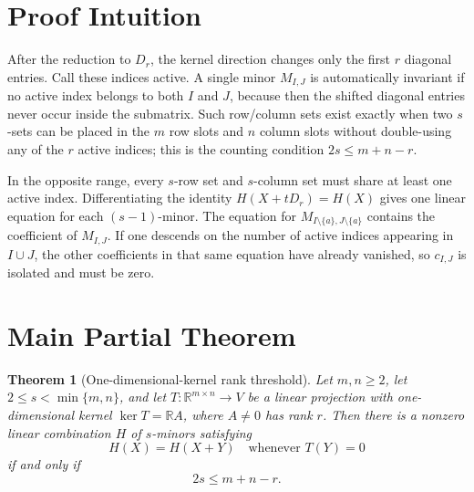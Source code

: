 \documentclass[11pt]{article}
\newtheorem{theorem}{Theorem}
\newcommand{\R}{\mathbb R}
\begin{document}
\section*{Proof Intuition}

After the reduction to $D_r$, the kernel direction changes only the first $r$
diagonal entries. Call these indices active. A single minor $M_{I,J}$ is
automatically invariant if no active index belongs to both $I$ and $J$, because
then the shifted diagonal entries never occur inside the submatrix. Such
row/column sets exist exactly when two $s$-sets can be placed in the $m$ row
slots and $n$ column slots without double-using any of the $r$ active indices;
this is the counting condition $2s\le m+n-r$.

In the opposite range, every $s$-row set and $s$-column set must share at least
one active index. Differentiating the identity $H(X+tD_r)=H(X)$ gives one
linear equation for each $(s-1)$-minor. The equation for
$M_{I\setminus\{a\},J\setminus\{a\}}$ contains the coefficient of
$M_{I,J}$. If one descends on the number of active indices appearing in
$I\cup J$, the other coefficients in that same equation have already vanished,
so $c_{I,J}$ is isolated and must be zero.

\section*{Main Partial Theorem}

\begin{theorem}[One-dimensional-kernel rank threshold]
\label{thm:main}
Let $m,n\ge 2$, let $2\le s<\min\{m,n\}$, and let
$T:\R^{m\times n}\to V$ be a linear projection with one-dimensional kernel
$\ker T=\R A$, where $A\ne0$ has rank $r$. Then there is a nonzero linear
combination $H$ of $s$-minors satisfying
\[
  H(X)=H(X+Y)\quad\text{whenever }T(Y)=0
\]
if and only if
\[
  2s\le m+n-r.
\]
\end{theorem}
\end{document}
